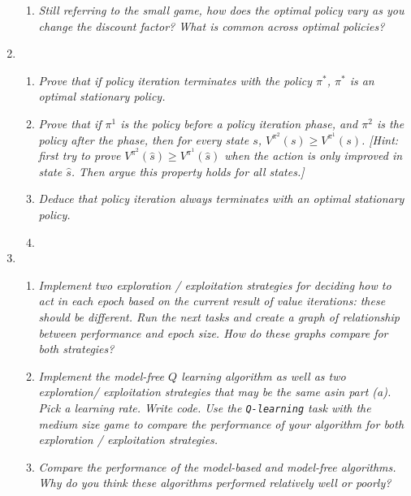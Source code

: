 \documentclass{article}
\begin{document}
\begin{enumerate}
\begin{enumerate}
  \item \emph{Still referring to the small game, how does the optimal
  policy vary as you change the discount factor? What is common
  across optimal policies?}



  \end{enumerate}

\item 
  \begin{enumerate}
  \item \emph{Prove that if policy iteration terminates with the policy
  $\pi^*$, $\pi^*$ is an optimal stationary policy.}

  \item \emph{Prove that if $\pi^1$ is the policy before a policy iteration
  phase, and $\pi^2$ is the policy after the phase, then for every state $s$,
  $V^{\pi^2}(s)\geq V^{\pi^1}(s)$. [Hint: first try to prove $V^{\pi^2}(\hat s)\geq V^{\pi^1}(\hat s)$
  when the action is only improved in state $\hat s$. Then argue this property
  holds for all states.]}

  \item \emph{Deduce that policy iteration always terminates with an
  optimal stationary policy.}

  \item 

  \end{enumerate}

\item 
  \begin{enumerate}
  \item \emph{Implement two exploration / exploitation strategies for deciding how to act
  in each epoch based on the current result of value iterations: these should be different.
  Run the next tasks and create a graph of relationship between performance and epoch
  size. How do these graphs compare for both strategies?}

  \item \emph{Implement the model-free $Q$ learning algorithm as well as two exploration/
  exploitation strategies that may be the same asin part (a). Pick a learning rate. Write 
  code. Use the \texttt{Q-learning} task with the medium size game to compare the 
  performance of your algorithm for both exploration / exploitation strategies.}

  \item \emph{Compare the performance of the model-based and model-free algorithms. Why 
  do you think these algorithms performed relatively well or poorly?}


  \end{enumerate}

\end{enumerate}
\end{document}
